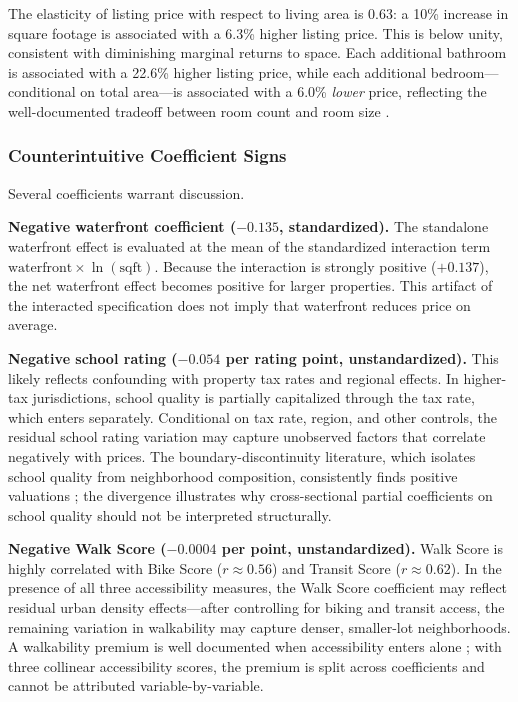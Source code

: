 The elasticity of listing price with respect to living area is 0.63: a 10\% increase in square footage is associated with a 6.3\% higher listing price. This is below unity, consistent with diminishing marginal returns to space. Each additional bathroom is associated with a 22.6\% higher listing price, while each additional bedroom---conditional on total area---is associated with a 6.0\% \textit{lower} price, reflecting the well-documented tradeoff between room count and room size \citep{sirmans2005composition}.

\subsubsection{Counterintuitive Coefficient Signs}

Several coefficients warrant discussion.

\textbf{Negative waterfront coefficient ($-0.135$, standardized).} The standalone waterfront effect is evaluated at the mean of the standardized interaction term $\text{waterfront} \times \ln(\text{sqft})$. Because the interaction is strongly positive ($+0.137$), the net waterfront effect becomes positive for larger properties. This artifact of the interacted specification does not imply that waterfront reduces price on average.

\textbf{Negative school rating ($-0.054$ per rating point, unstandardized).} This likely reflects confounding with property tax rates and regional effects. In higher-tax jurisdictions, school quality is partially capitalized through the tax rate, which enters separately. Conditional on tax rate, region, and other controls, the residual school rating variation may capture unobserved factors that correlate negatively with prices. The boundary-discontinuity literature, which isolates school quality from neighborhood composition, consistently finds positive valuations \citep{black1999better, bayer2007unified}; the divergence illustrates why cross-sectional partial coefficients on school quality should not be interpreted structurally.

\textbf{Negative Walk Score ($-0.0004$ per point, unstandardized).} Walk Score is highly correlated with Bike Score ($r \approx 0.56$) and Transit Score ($r \approx 0.62$). In the presence of all three accessibility measures, the Walk Score coefficient may reflect residual urban density effects---after controlling for biking and transit access, the remaining variation in walkability may capture denser, smaller-lot neighborhoods. A walkability premium is well documented when accessibility enters alone \citep{pivo2011walkability}; with three collinear accessibility scores, the premium is split across coefficients and cannot be attributed variable-by-variable.

